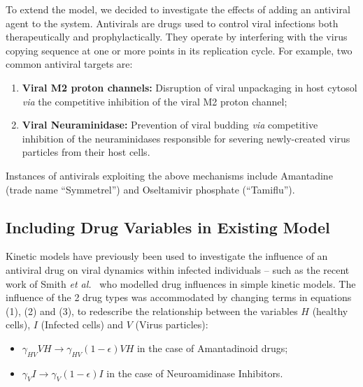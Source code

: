 \documentclass[a4paper, 12pt]{report}
\begin{document}
To extend the model, we decided to investigate the effects of adding an antiviral agent to the system. Antivirals are drugs used to control viral infections both therapeutically and prophylactically. They operate by interfering with the virus copying sequence at one or more points in its replication cycle. For example, two common antiviral targets are:
\begin{enumerate}
\item \textbf{Viral M2 proton channels:} Disruption of viral unpackaging in host cytosol \textit{via} the competitive inhibition of the viral M2 proton channel;~\cite{Hu}
\item \textbf{Viral Neuraminidase:} Prevention of viral budding \textit{via} competitive inhibition of the neuraminidases responsible for severing newly-created virus particles from their host cells.\cite{Satoh}  
\end{enumerate}
Instances of antivirals exploiting the above mechanisms include  Amantadine (trade name ``Symmetrel'') and Oseltamivir phosphate (``Tamiflu'').\\

\subsection{Including Drug Variables in Existing Model}

Kinetic models have previously been used to investigate the influence of an antiviral drug on viral dynamics within infected individuals -- such as the recent work of Smith \textit{et al.}~\cite{Smith} who modelled drug influences in simple kinetic models.
The influence of the 2 drug types was accommodated by changing terms in equations (1), (2) and (3), to redescribe the relationship between the variables $H$ (healthy cells), $I$ (Infected cells) and $V$ (Virus particles):

\begin{itemize}
\item  $\gamma_{HV}VH \rightarrow \gamma_{HV}(1 - \epsilon)VH$ in the case of Amantadinoid drugs;
\item $\gamma_{V}I \rightarrow \gamma_{V}(1 - \epsilon)I $ in the case of Neuroamidinase Inhibitors.
\end{itemize}
\end{document}
